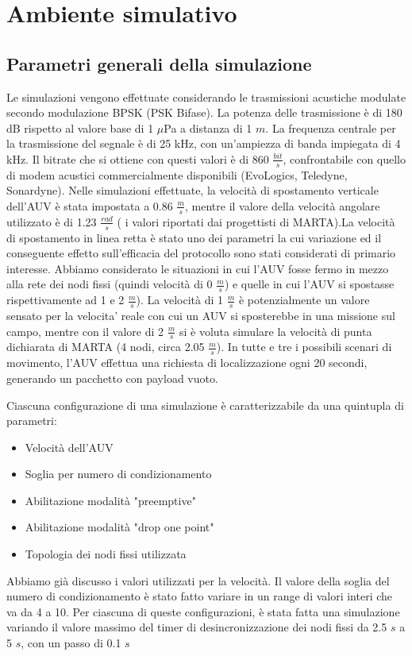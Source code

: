 \documentclass[Lau,binding=0.6cm]{sapthesis}
\begin{document}
\section{Ambiente simulativo}

\subsection{Parametri generali della simulazione}
\par
Le simulazioni vengono effettuate considerando le trasmissioni acustiche modulate secondo modulazione BPSK (PSK Bifase). La potenza delle trasmissione è di 180 dB rispetto al valore base di 1 $\mu$Pa a distanza di 1 $m$. La frequenza centrale per la trasmissione del segnale è di 25 kHz, con un'ampiezza di banda impiegata di 4 kHz. Il bitrate che si ottiene con questi valori è di 860 $\frac{bit}{s}$, confrontabile con quello di modem acustici commercialmente disponibili (EvoLogics, Teledyne, Sonardyne).
Nelle simulazioni effettuate, la velocità di spostamento verticale dell'AUV è stata impostata a 0.86 \(\frac{m}{s}\), mentre il valore della velocità angolare utilizzato è di 1.23 \(\frac{rad}{s}\) ( i valori riportati dai progettisti di MARTA).\newline La velocità di spostamento in linea retta è stato uno dei parametri la cui variazione ed il conseguente effetto sull'efficacia del protocollo sono stati considerati di primario interesse. Abbiamo considerato le situazioni in cui l'AUV fosse fermo in mezzo alla rete dei nodi fissi (quindi velocità di 0 \(\frac{m}{s}\)) e quelle in cui l'AUV si spostasse rispettivamente ad 1 e 2 \(\frac{m}{s}\)). La velocità di 1 $\frac{m}{s}$ è potenzialmente un valore sensato per la velocita' reale con cui un AUV si sposterebbe in una missione sul campo, mentre con il valore di 2 $\frac{m}{s}$ si è voluta simulare la velocità di punta dichiarata di MARTA (4 nodi, circa 2.05 $\frac{m}{s}$). In tutte e tre i possibili scenari di movimento, l'AUV effettua una richiesta di localizzazione ogni 20 secondi, generando un pacchetto con payload vuoto.
\par
Ciascuna configurazione di una simulazione è caratterizzabile da una quintupla di parametri:
\begin{itemize}
    \item Velocità dell'AUV
    \item Soglia per numero di condizionamento
    \item Abilitazione modalità "preemptive"
    \item Abilitazione modalità "drop one point"
    \item Topologia dei nodi fissi utilizzata
\end{itemize}
Abbiamo già discusso i valori utilizzati per la velocità. Il valore della soglia del numero di condizionamento è stato fatto variare in un range di valori interi che va da 4 a 10. Per ciascuna di queste configurazioni, è stata fatta una simulazione variando il valore massimo del timer di desincronizzazione dei nodi fissi da 2.5 $s$ a 5 $s$, con un passo di 0.1 $s$
\end{document}
